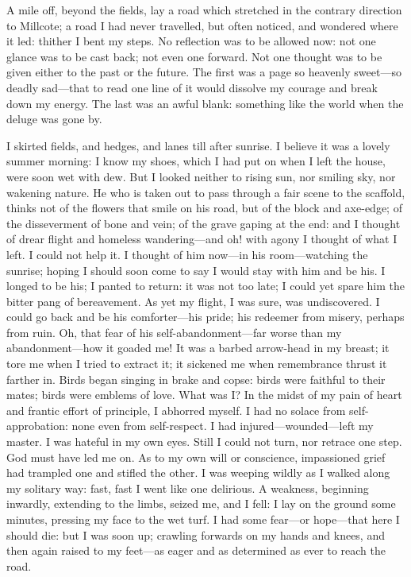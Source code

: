 A mile off, beyond the fields, lay a road which stretched in the
contrary direction to Millcote; a road I had never travelled, but often
noticed, and wondered where it led: thither I bent my steps. No
reflection was to be allowed now: not one glance was to be cast back;
not even one forward. Not one thought was to be given either to the
past or the future. The first was a page so heavenly sweet---so deadly
sad---that to read one line of it would dissolve my courage and break
down my energy. The last was an awful blank: something like the world
when the deluge was gone by.

I skirted fields, and hedges, and lanes till after sunrise. I believe
it was a lovely summer morning: I know my shoes, which I had put on when
I left the house, were soon wet with dew. But I looked neither to
rising sun, nor smiling sky, nor wakening nature. He who is taken out
to pass through a fair scene to the scaffold, thinks not of the flowers
that smile on his road, but of the block and axe-edge; of the
disseverment of bone and vein; of the grave gaping at the end: and I
thought of drear flight and homeless wandering---and oh! with agony I
thought of what I left. I could not help it. I thought of him now---in
his room---watching the sunrise; hoping I should soon come to say I
would stay with him and be his. I longed to be his; I panted to return:
it was not too late; I could yet spare him the bitter pang of
bereavement. As yet my flight, I was sure, was undiscovered. I could
go back and be his comforter---his pride; his redeemer from misery,
perhaps from ruin. Oh, that fear of his self-abandonment---far worse
than my abandonment---how it goaded me! It was a barbed arrow-head in
my breast; it tore me when I tried to extract it; it sickened me when
remembrance thrust it farther in. Birds began singing in brake and
copse: birds were faithful to their mates; birds were emblems of love. 
What was I? In the midst of my pain of heart and frantic effort of
principle, I abhorred myself. I had no solace from self-approbation:
none even from self-respect. I had injured---wounded---left my master. 
I was hateful in my own eyes. Still I could not turn, nor retrace one
step. God must have led me on. As to my own will or conscience,
impassioned grief had trampled one and stifled the other. I was weeping
wildly as I walked along my solitary way: fast, fast I went like one
delirious. A weakness, beginning inwardly, extending to the limbs,
seized me, and I fell: I lay on the ground some minutes, pressing my
face to the wet turf. I had some fear---or hope---that here I should
die: but I was soon up; crawling forwards on my hands and knees, and
then again raised to my feet---as eager and as determined as ever to
reach the road.

